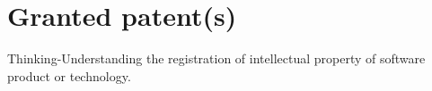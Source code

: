 \documentclass{moderncv}
\begin{document}
\section{Granted patent(s)}

Thinking-Understanding the registration of intellectual property of software product or technology.

\printbibliography[title={Selected papers}, category = crucial]
 
\nocite{*}
\end{document}
